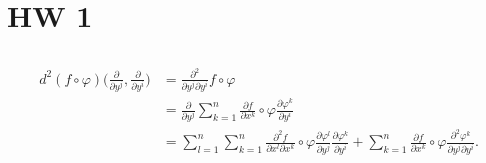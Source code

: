 \section{HW 1}

\subsection{} %

\subsubsection{} %

\begin{align}
    d^2 (f\circ\varphi)\bigg(\frac{\partial}{\partial y^j},\frac{\partial}{\partial y^i}\bigg)
        &= \frac{\partial^2}{\partial y^j\partial y^i}f\circ\varphi \\
        &= \frac{\partial}{\partial y^j} \sum_{k=1}^n \frac{\partial f}{\partial x^k}\circ\varphi\frac{\partial \varphi^k}{\partial y^i} \\
        &= \sum_{l=1}^n\sum_{k=1}^n \frac{\partial^2 f}{\partial x^l\partial x^k}\circ\varphi\frac{\partial \varphi^l}{\partial y^j}\frac{\partial \varphi^k}{\partial y^i}
            + \sum_{k=1}^n \frac{\partial f}{\partial x^k}\circ\varphi\frac{\partial^2 \varphi^k}{\partial y^j\partial y^i}. \\
\end{align}

\subsubsection{} %
